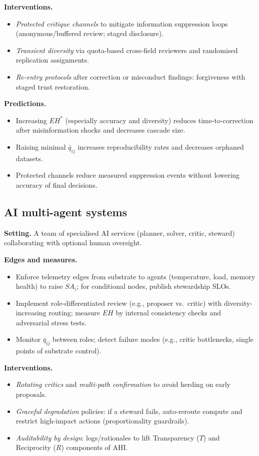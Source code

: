 \documentclass[12pt]{article}
\begin{document}
\noindent\textbf{Interventions.}
\begin{itemize}[leftmargin=1.2em]
\item \emph{Protected critique channels} to mitigate information suppression loops (anonymous/buffered review; staged disclosure).
\item \emph{Transient diversity} via quota-based cross-field reviewers and randomised replication assignments.
\item \emph{Re-entry protocols} after correction or misconduct findings: forgiveness with staged trust restoration.
\end{itemize}

\noindent\textbf{Predictions.}
\begin{itemize}[leftmargin=1.2em]
\item Increasing $EH^\ast$ (especially accuracy and diversity) reduces time-to-correction after misinformation shocks and decreases cascade size.
\item Raising minimal $\bar{q}_{ij}$ increases reproducibility rates and decreases orphaned datasets.
\item Protected channels reduce measured suppression events without lowering accuracy of final decisions.
\end{itemize}

\subsection{AI multi-agent systems}
\textbf{Setting.} A team of specialised AI services (planner, solver, critic, steward) collaborating with optional human oversight.
\medskip

\noindent\textbf{Edges and measures.}
\begin{itemize}[leftmargin=1.2em]
\item Enforce telemetry edges from substrate to agents (temperature, load, memory health) to raise $SA_i$; for conditional nodes, publish stewardship SLOs.
\item Implement role-differentiated review (e.g., proposer vs.\ critic) with diversity-increasing routing; measure $EH$ by internal consistency checks and adversarial stress tests.
\item Monitor $\bar{q}_{ij}$ between roles; detect failure modes (e.g., critic bottlenecks, single points of substrate control).
\end{itemize}

\noindent\textbf{Interventions.}
\begin{itemize}[leftmargin=1.2em]
\item \emph{Rotating critics} and \emph{multi-path confirmation} to avoid herding on early proposals.
\item \emph{Graceful degradation} policies: if a steward fails, auto-reroute compute and restrict high-impact actions (proportionality guardrails).
\item \emph{Auditability by design}: logs/rationales to lift Transparency ($T$) and Reciprocity ($R$) components of AHI.
\end{itemize}
\end{document}
